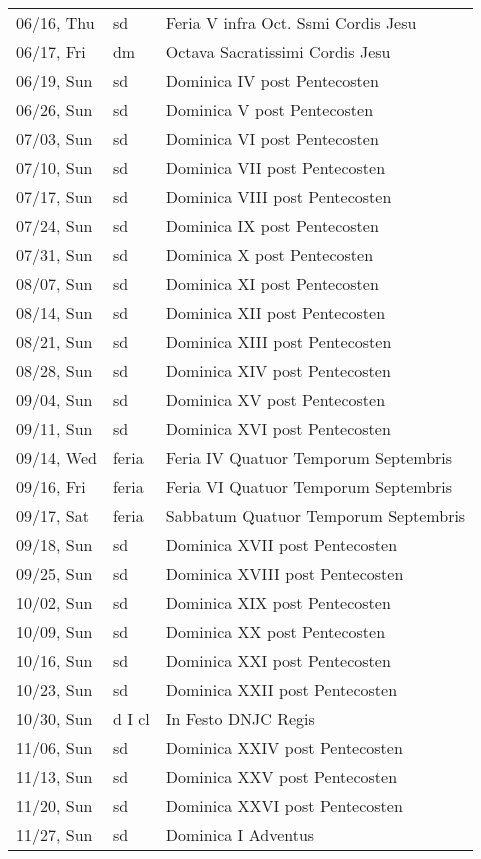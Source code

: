 \documentclass{article}
\begin{document}
\begin{longtable}{ l l l }
06/16, Thu & sd & Feria V infra Oct. Ssmi Cordis Jesu\\
06/17, Fri & dm & Octava Sacratissimi Cordis Jesu\\
06/19, Sun & sd & Dominica IV post Pentecosten\\
06/26, Sun & sd & Dominica V post Pentecosten\\
07/03, Sun & sd & Dominica VI post Pentecosten\\
07/10, Sun & sd & Dominica VII post Pentecosten\\
07/17, Sun & sd & Dominica VIII post Pentecosten\\
07/24, Sun & sd & Dominica IX post Pentecosten\\
07/31, Sun & sd & Dominica X post Pentecosten\\
08/07, Sun & sd & Dominica XI post Pentecosten\\
08/14, Sun & sd & Dominica XII post Pentecosten\\
08/21, Sun & sd & Dominica XIII post Pentecosten\\
08/28, Sun & sd & Dominica XIV post Pentecosten\\
09/04, Sun & sd & Dominica XV post Pentecosten\\
09/11, Sun & sd & Dominica XVI post Pentecosten\\
09/14, Wed & feria & Feria IV Quatuor Temporum Septembris\\
09/16, Fri & feria & Feria VI Quatuor Temporum Septembris\\
09/17, Sat & feria & Sabbatum Quatuor Temporum Septembris\\
09/18, Sun & sd & Dominica XVII post Pentecosten\\
09/25, Sun & sd & Dominica XVIII post Pentecosten\\
10/02, Sun & sd & Dominica XIX post Pentecosten\\
10/09, Sun & sd & Dominica XX post Pentecosten\\
10/16, Sun & sd & Dominica XXI post Pentecosten\\
10/23, Sun & sd & Dominica XXII post Pentecosten\\
10/30, Sun & d I cl & In Festo DNJC Regis\\
11/06, Sun & sd & Dominica XXIV post Pentecosten\\
11/13, Sun & sd & Dominica XXV post Pentecosten\\
11/20, Sun & sd & Dominica XXVI post Pentecosten\\
11/27, Sun & sd & Dominica I Adventus\\

\end{longtable}
\end{document}
